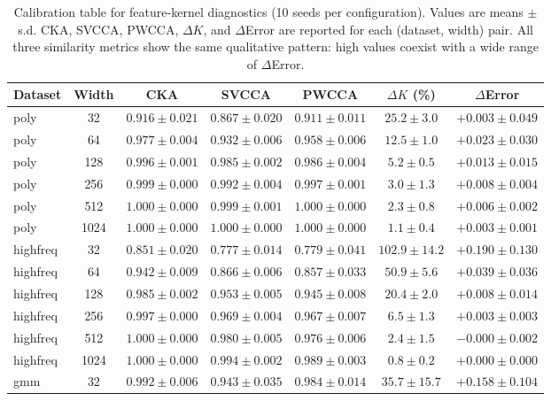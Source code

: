 \documentclass[twoside,11pt]{article}
\begin{document}
\begin{table}[t]
    \centering\footnotesize
        \caption{Calibration table for feature-kernel diagnostics (10 seeds per configuration).  Values are means $\pm$ s.d.  CKA, SVCCA, PWCCA, $\Delta K$, and $\Delta$Error are reported for each (dataset, width) pair.  All three similarity metrics show the same qualitative pattern: high values coexist with a wide range of $\Delta$Error.}
    \label{tab:results}
    \begin{tabular}{lcccccc}
    \toprule
    Dataset & Width & CKA & SVCCA & PWCCA & $\Delta K$ (\%) & $\Delta$Error \\
    \midrule
    poly & 32   & $0.916\pm0.021$ & $0.867\pm0.020$ & $0.911\pm0.011$ & $25.2\pm3.0$ & $+0.003\pm0.049$ \\
    poly & 64   & $0.977\pm0.004$ & $0.932\pm0.006$ & $0.958\pm0.006$ & $12.5\pm1.0$ & $+0.023\pm0.030$ \\
    poly & 128  & $0.996\pm0.001$ & $0.985\pm0.002$ & $0.986\pm0.004$ & $5.2\pm0.5$  & $+0.013\pm0.015$ \\
    poly & 256  & $0.999\pm0.000$ & $0.992\pm0.004$ & $0.997\pm0.001$ & $3.0\pm1.3$  & $+0.008\pm0.004$ \\
    poly & 512  & $1.000\pm0.000$ & $0.999\pm0.001$ & $1.000\pm0.000$ & $2.3\pm0.8$  & $+0.006\pm0.002$ \\
    poly & 1024 & $1.000\pm0.000$ & $1.000\pm0.000$ & $1.000\pm0.000$ & $1.1\pm0.4$  & $+0.003\pm0.001$ \\
    \midrule
    highfreq & 32  & $0.851\pm0.020$ & $0.777\pm0.014$ & $0.779\pm0.041$ & $102.9\pm14.2$ & $+0.190\pm0.130$ \\
    highfreq & 64  & $0.942\pm0.009$ & $0.866\pm0.006$ & $0.857\pm0.033$ & $50.9\pm5.6$   & $+0.039\pm0.036$ \\
    highfreq & 128 & $0.985\pm0.002$ & $0.953\pm0.005$ & $0.945\pm0.008$ & $20.4\pm2.0$   & $+0.008\pm0.014$ \\
    highfreq & 256 & $0.997\pm0.000$ & $0.969\pm0.004$ & $0.967\pm0.007$ & $6.5\pm1.3$    & $+0.003\pm0.003$ \\
    highfreq & 512 & $1.000\pm0.000$ & $0.980\pm0.005$ & $0.976\pm0.006$ & $2.4\pm1.5$    & $-0.000\pm0.002$ \\
    highfreq & 1024 & $1.000\pm0.000$ & $0.994\pm0.002$ & $0.989\pm0.003$ & $0.8\pm0.2$    & $+0.000\pm0.000$ \\
    \midrule
    gmm & 32  & $0.992\pm0.006$ & $0.943\pm0.035$ & $0.984\pm0.014$ & $35.7\pm15.7$ & $+0.158\pm0.104$ \\

\end{tabular}
\end{table}
\end{document}
